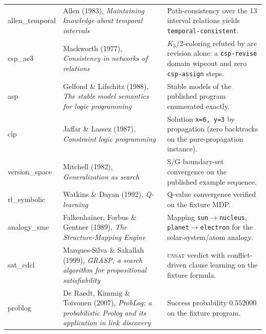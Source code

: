 \documentclass[11pt,oneside]{report}
\begin{document}
\begin{small}
\begin{longtable}{p{2.5cm}p{6.2cm}p{4.9cm}}
allen\_temporal & Allen (1983), \emph{Maintaining knowledge about temporal intervals} \cite{allen1983} & Path-consistency over the 13 interval relations yields \texttt{temporal-consistent}. \\
csp\_ac3 & Mackworth (1977), \emph{Consistency in networks of relations} \cite{mackworth1977} & $K_3$/2-coloring refuted by arc revision alone: a \texttt{csp-revise} domain wipeout and zero \texttt{csp-assign} steps. \\
asp & Gelfond \& Lifschitz (1988), \emph{The stable model semantics for logic programming} \cite{gelfond1988} & Stable models of the published program enumerated exactly. \\
clp & Jaffar \& Lassez (1987), \emph{Constraint logic programming} \cite{jaffar1987} & Solution \texttt{x=6, y=3} by propagation (zero backtracks on the pure-propagation instance). \\
version\_space & Mitchell (1982), \emph{Generalization as search} \cite{mitchell1982} & S/G boundary-set convergence on the published example sequence. \\
rl\_symbolic & Watkins \& Dayan (1992), \emph{Q-learning} \cite{watkins1992} & Q-value convergence verified on the fixture MDP. \\
analogy\_sme & Falkenhainer, Forbus \& Gentner (1989), \emph{The Structure-Mapping Engine} \cite{falkenhainer1989} & Mapping \texttt{sun$\to$nucleus}, \texttt{planet$\to$electron} for the solar-system/atom analogy. \\
sat\_cdcl & Marques-Silva \& Sakallah (1999), \emph{GRASP: a search algorithm for propositional satisfiability} \cite{marquessilva1999} & \textsc{unsat} verdict with conflict-driven clause learning on the fixture formula. \\
problog & De Raedt, Kimmig \& Toivonen (2007), \emph{ProbLog: a probabilistic Prolog and its application in link discovery} \cite{deraedt2007} & Success probability $0.552000$ on the fixture program. \\
\end{longtable}
\end{small}
\end{document}
